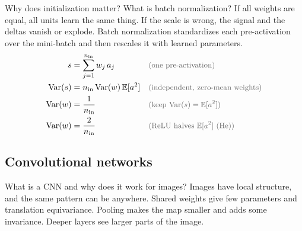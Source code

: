\begin{qabox}{Why does initialization matter? What is batch normalization?}
\explain If all weights are equal, all units learn the same thing. If the scale is wrong, the
signal and the deltas vanish or explode. Batch normalization standardizes each pre-activation over
the mini-batch and then rescales it with learned parameters.
\derive
\begin{align*}
s &= \sum_{j=1}^{n_{\mathrm{in}}} w_j\,a_j \why{one pre-activation} \\
\mathrm{Var}(s) &= n_{\mathrm{in}}\,\mathrm{Var}(w)\,\mathbb{E}[a^2] \why{independent, zero-mean weights} \\
\mathrm{Var}(w) &= \frac{1}{n_{\mathrm{in}}} \why{keep $\mathrm{Var}(s) = \mathbb{E}[a^2]$} \\
\mathrm{Var}(w) &= \frac{2}{n_{\mathrm{in}}} \why{ReLU halves $\mathbb{E}[a^2]$ (He)}
\end{align*}
\end{qabox}

\subsection{Convolutional networks}

\begin{qabox}{What is a CNN and why does it work for images?}
\explain Images have local structure, and the same pattern can be anywhere. Shared weights give few
parameters and translation equivariance. Pooling makes the map smaller and adds some invariance.
Deeper layers see larger parts of the image.
\end{qabox}

